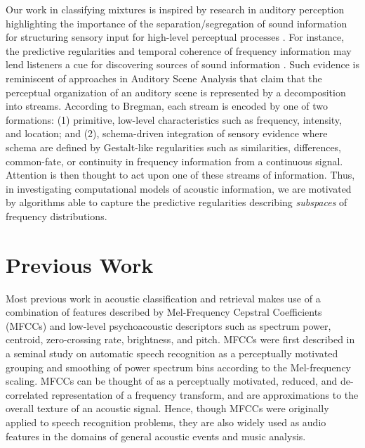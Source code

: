 \documentclass[a4paper,10pt,final]{ThesisStyle}
\begin{document}
Our work in classifying mixtures is inspired by research in auditory perception highlighting the importance of the separation/segregation of sound information for structuring sensory input for high-level perceptual processes \cite{Winkler2009a,Teki2011a}.  For instance, the predictive regularities and temporal coherence of frequency information may lend listeners a cue for discovering sources of sound information \cite{Winkler2009a, Shamma2011}.  Such evidence is reminiscent of approaches in Auditory Scene Analysis \cite{Bregman1990} that claim that the perceptual organization of an auditory scene is represented by a decomposition into streams.  According to Bregman, each stream is encoded by one of two formations: (1) primitive, low-level characteristics such as frequency, intensity, and location; and (2), schema-driven integration of sensory evidence where schema are defined by Gestalt-like regularities such as similarities, differences, common-fate, or continuity in frequency information from a continuous signal.  Attention is then thought to act upon one of these streams of information.  Thus, in investigating computational models of acoustic information, we are motivated by algorithms able to capture the predictive regularities describing \textit{subspaces} of frequency distributions. 


\section{Previous Work}

Most previous work in acoustic classification and retrieval makes use of a combination of features described by Mel-Frequency Cepstral Coefficients (MFCCs) and low-level psychoacoustic descriptors \cite{Temko2007,Guo2003a,McKinney2003,Allamanche2001} such as spectrum power, centroid, zero-crossing rate, brightness, and pitch.  MFCCs were first described in a seminal study on automatic speech recognition \cite{Davis1980} as a perceptually motivated grouping and smoothing of power spectrum bins according to the Mel-frequency scaling.  MFCCs can be thought of as a perceptually motivated, reduced, and de-correlated representation of a frequency transform, and are approximations to the overall texture of an acoustic signal.  Hence, though MFCCs were originally applied to speech recognition problems, they are also widely used as audio features in the domains of general acoustic events \cite{Temko2007} and music \cite{Pampalk2006a,McKinney2003} analysis.  
\end{document}
